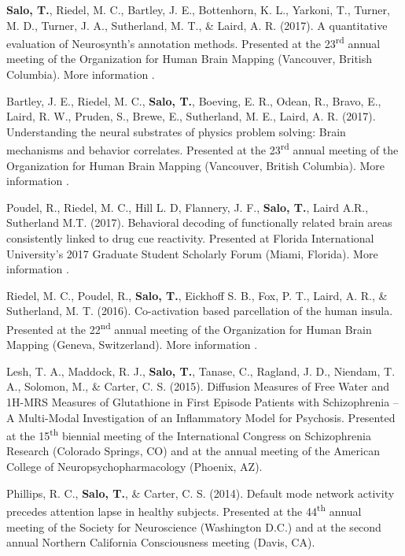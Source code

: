 \documentclass[10pt]{article}
\newcommand{\textlink}[3][blue]{\href{#2}{\color{#1}{#3}}}
\begin{document}
\begin{hangparas}{.25in}{1}
	\bigskip

	\textbf{Salo, T.}, Riedel, M. C., Bartley, J. E., Bottenhorn, K. L., Yarkoni, T.,
	Turner, M. D., Turner, J. A., Sutherland, M. T., \& Laird, A. R. (2017).
	A quantitative evaluation of Neurosynth's annotation methods. Presented at
	the 23\textsuperscript{rd} annual meeting of the Organization for Human Brain
	Mapping (Vancouver, British Columbia).
	More information
	\textlink{https://nbclab.github.io/posters/salo-neurosynth-poster}{here}.

	\bigskip

	Bartley, J. E., Riedel, M. C., \textbf{Salo, T.}, Boeving, E. R., Odean, R.,
	Bravo, E., Laird, R. W., Pruden, S., Brewe, E., Sutherland, M. E.,
	Laird, A. R. (2017).
	Understanding the neural substrates of physics problem solving: Brain
	mechanisms and behavior correlates. Presented at the 23\textsuperscript{rd}
	annual meeting of the Organization for Human Brain Mapping (Vancouver, British
	Columbia).
	More information
	\textlink{https://nbclab.github.io/posters/bartley-physics-poster}{here}.

	\bigskip

	Poudel, R.,  Riedel, M. C., Hill L. D, Flannery, J. F., \textbf{Salo, T.},
	Laird A.R., Sutherland M.T. (2017).
	Behavioral decoding of functionally related brain areas consistently linked
	to drug cue reactivity.
	Presented at Florida International University's 2017 Graduate Student
	Scholarly Forum (Miami, Florida).
	More information
	\textlink{https://nbclab.github.io/posters/poudel-cue-reactivity-poster}{here}.

	\bigskip

	Riedel, M. C., Poudel, R., \textbf{Salo, T.}, Eickhoff S. B., Fox, P. T.,
	Laird, A. R., \& Sutherland, M. T. (2016).
	Co-activation based parcellation of the human insula.
	Presented at the 22\textsuperscript{nd} annual meeting of the Organization
	for Human Brain Mapping (Geneva, Switzerland).
	More information
	\textlink{https://osf.io/pqvqy}{here}.

	\bigskip

	Lesh, T. A., Maddock, R. J., \textbf{Salo, T.}, Tanase, C., Ragland, J. D.,
	Niendam, T. A., Solomon, M., \& Carter, C. S. (2015).
	Diffusion Measures of Free Water and 1H-MRS Measures of Glutathione in First
	Episode Patients with Schizophrenia -- A Multi-Modal Investigation of an
	Inflammatory Model for Psychosis.
	Presented at the 15\textsuperscript{th} biennial meeting of the International
	Congress on Schizophrenia Research (Colorado Springs, CO) and at
	the annual meeting of the American College of Neuropsychopharmacology
	(Phoenix, AZ).

	\bigskip

	Phillips, R. C., \textbf{Salo, T.}, \& Carter, C. S. (2014).
	Default mode network activity precedes attention lapse in healthy subjects.
	Presented at the 44\textsuperscript{th} annual meeting of the Society for
	Neuroscience (Washington D.C.) and at the second annual Northern California
	Consciousness meeting (Davis, CA).

\end{hangparas}
\end{document}

